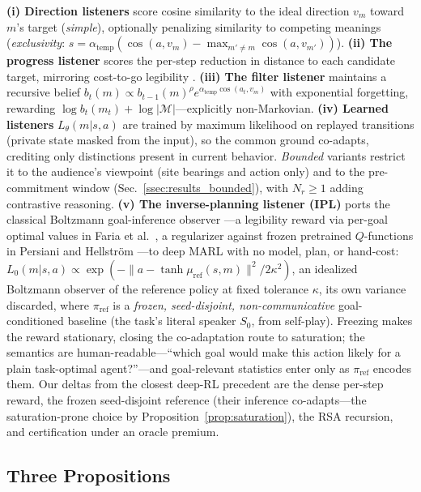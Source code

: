 \documentclass[sigconf,review,anonymous]{acmart}
\newcommand{\Ltheta}{L_\theta}
\begin{document}
\textbf{(i) Direction listeners} score cosine similarity to the ideal direction $v_m$ toward $m$'s target (\emph{simple}), optionally penalizing similarity to competing meanings (\emph{exclusivity}: $s = \alpha_{\text{temp}}(\cos(a,v_m) - \max_{m'\neq m}\cos(a,v_{m'}))$).
\textbf{(ii) The progress listener} scores the per-step reduction in distance to each candidate target, mirroring cost-to-go legibility \cite{dragan2013legibility}.
\textbf{(iii) The filter listener} maintains a recursive belief $b_t(m) \propto b_{t-1}(m)^{\rho} e^{\alpha_{\text{temp}}\cos(a_t, v_m)}$ with exponential forgetting, rewarding $\log b_t(m_t) + \log|\mathcal{M}|$---explicitly non-Markovian.
\textbf{(iv) Learned listeners} $\Ltheta(m|s,a)$ are trained by maximum likelihood on replayed transitions (private state masked from the input), so the common ground co-adapts, crediting only distinctions present in current behavior. \emph{Bounded} variants restrict it to the audience's viewpoint (site bearings and action only) and to the pre-commitment window (Sec.~\ref{ssec:results_bounded}), with $N_r \ge 1$ adding contrastive reasoning.
\textbf{(v) The inverse-planning listener (IPL)} ports the classical Boltzmann goal-inference observer \cite{baker2017rational,ramirez2010plan}---a legibility reward via per-goal optimal values in Faria et al.\ \cite{faria2024guess}, a regularizer against frozen pretrained $Q$-functions in Persiani and Hellstr{\"o}m \cite{persiani2022policy}---to deep MARL with no model, plan, or hand-cost: $L_0(m|s,a) \propto \exp(-\|a - \tanh\mu_{\text{ref}}(s,m)\|^2 / 2\kappa^2)$, an idealized Boltzmann observer of the reference policy at fixed tolerance $\kappa$, its own variance discarded, where $\pi_{\text{ref}}$ is a \emph{frozen, seed-disjoint, non-communicative} goal-conditioned baseline (the task's literal speaker $S_0$, from self-play). Freezing makes the reward stationary, closing the co-adaptation route to saturation; the semantics are human-readable---``which goal would make this action likely for a plain task-optimal agent?''---and goal-relevant statistics enter only as $\pi_{\text{ref}}$ encodes them. Our deltas from the closest deep-RL precedent \cite{caselles2022pragmatically} are the dense per-step reward, the frozen seed-disjoint reference (their inference co-adapts---the saturation-prone choice by Proposition~\ref{prop:saturation}), the RSA recursion, and certification under an oracle premium.

\subsection{Three Propositions}
\label{ssec:theory}
\end{document}
